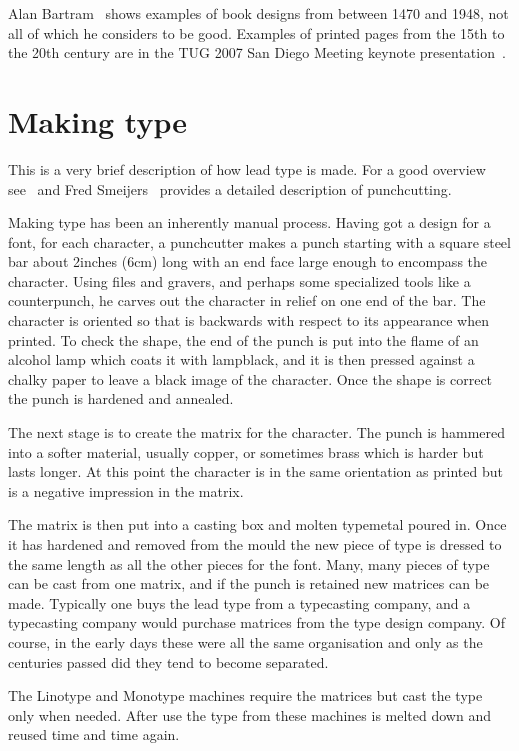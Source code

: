\documentclass[10pt,letterpaper,extrafontsizes]{memoir}
\begin{document}
    Alan Bartram~\autocite{BARTRAM01} shows examples of book designs from between
1470 and 1948, not all of which he considers to be good. Examples of printed
pages from the 15th to the 20th century are in the TUG 2007 San Diego Meeting
keynote presentation~\autocite{TUGKEYNOTE07}.


\section{Making type}

    This is a very brief description of how lead type is made. For
a good overview see~\autocite{CHAPPELL99} and Fred Smeijers~\autocite{SMEIJERS96}
provides a detailed description of punchcutting.
 
    Making type has been an inherently manual process. Having got a design
for a font, for each character, a punchcutter makes a punch starting 
with a square steel bar about 2inches (6cm) long with an 
end face large enough to encompass the character. Using files and gravers,
and perhaps some specialized tools like a counterpunch, 
he carves out the character in relief on one end of the bar. The character
is oriented so that is backwards with respect to its appearance when printed.
To check the shape, the end of the punch is put into the flame of an alcohol
lamp which coats it with lampblack, and it is then pressed against a chalky 
paper to leave a black image of the character. Once the shape is correct 
the punch is hardened and annealed.

   The next stage is to create the matrix for the character. The punch is
hammered into a softer material, usually copper, or sometimes brass which
is harder but lasts longer. At this point the character is in the same
orientation as printed but is a negative impression in the matrix.

   The matrix is then put into a casting box and molten typemetal poured in.
Once it has hardened and removed from the mould the new piece of type is 
dressed to the same length as all the other pieces for the font. Many, many 
pieces of type can be cast from one matrix, and if the punch is retained new
matrices can be made. Typically one buys the lead type from a typecasting
company, and a typecasting company would purchase matrices from the type
design company. Of course, in the early days these were all the same 
organisation and only as the centuries passed did they tend to become
separated.

   The Linotype and Monotype machines 
require the matrices but cast the type only when needed. After use the type 
from these machines is melted down and reused time and time again.
\end{document}
